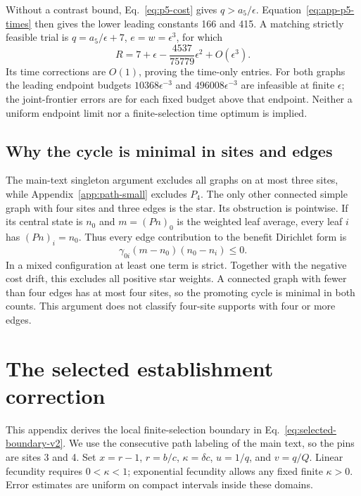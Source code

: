 \documentclass[aps,pre,reprint,amsmath,amssymb,longbibliography]{revtex4-2}
\begin{document}
Without a contrast bound, Eq.~\eqref{eq:p5-cost} gives
\(q>a_5/\epsilon\). Equation~\eqref{eq:app-p5-times} then gives
the lower leading constants 166 and 415. A matching strictly feasible
trial is \(q=a_5/\epsilon+7\), \(e=w=\epsilon^3\), for which
\begin{equation}
 R=7+\epsilon-\frac{4537}{75779}\epsilon^2+O(\epsilon^3).
 \label{eq:app-p5-time-trial}
\end{equation}
Its time corrections are \(O(1)\), proving the time-only entries.
For both graphs the leading endpoint budgets
$10368\epsilon^{-3}$ and $496008\epsilon^{-3}$ are infeasible at
finite \(\epsilon\); the joint-frontier errors are for each fixed
budget above that endpoint. Neither a uniform endpoint limit nor a
finite-selection time optimum is implied.

\subsection{Why the cycle is minimal in sites and edges}

The main-text singleton argument excludes all graphs on at most three
sites, while Appendix~\ref{app:path-small} excludes \(P_4\).
The only other connected simple graph with four sites and three edges
is the star. Its obstruction is pointwise. If its central
state is \(n_0\) and \(m=(Pn)_0\) is the weighted leaf average,
every leaf \(i\) has \((Pn)_i=n_0\). Thus every edge contribution
to the benefit Dirichlet form is
\begin{equation}
 \gamma_{0i}(m-n_0)(n_0-n_i)\le0.
 \label{eq:app-star-obstruction}
\end{equation}
In a mixed configuration at least one term is strict. Together with
the negative cost drift, this excludes all positive star weights.
A connected graph with fewer than four edges has at most four sites,
so the promoting cycle is minimal in both counts. This argument does
not classify four-site supports with four or more edges.

\section{The selected establishment correction}
\label{app:selected-boundary-v2}

This appendix derives the local finite-selection boundary in
Eq.~\eqref{eq:selected-boundary-v2}. We use the consecutive
path labeling of the main text, so the pins are sites 3 and 4.
Set \(x=r-1\), \(r=b/c\), \(\kappa=\delta c\),
\(u=1/q\), and \(v=q/Q\). Linear fecundity requires
\(0<\kappa<1\); exponential fecundity allows any fixed
finite \(\kappa>0\). Error estimates are uniform on compact
intervals inside these domains.
\end{document}
